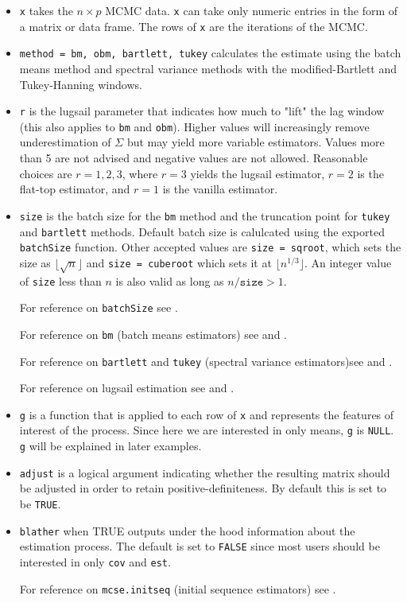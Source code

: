 \documentclass[11pt]{article}
\begin{document}
\begin{itemize}
\item \texttt{x} takes the $n \times p$ MCMC data. \texttt{x} can take only numeric entries in the form of a matrix or data frame. The rows of \texttt{x} are the iterations of the MCMC.

\item \texttt{method = bm, obm, bartlett, tukey} calculates the estimate using the batch means method and spectral variance methods with the modified-Bartlett and Tukey-Hanning windows.

\item \texttt{r} is the lugsail parameter that indicates how much to "lift" the lag window (this also  applies to \texttt{bm} and \texttt{obm}). Higher values will increasingly remove underestimation of $\Sigma$ but may yield more variable estimators. Values more than 5 are not advised and negative values are not allowed. Reasonable choices are $r = 1, 2, 3$, where $r = 3$ yields the lugsail estimator, $r = 2$ is the flat-top estimator, and $r = 1$ is the vanilla estimator. 

\item \texttt{size} is the batch size for the \texttt{bm} method and the truncation point for \texttt{tukey} and \texttt{bartlett} methods. Default batch size is calulcated using the exported \texttt{batchSize} function. Other accepted values are \texttt{size = sqroot}, which sets the size as $\lfloor \sqrt{n} \rfloor$ and \texttt{size = cuberoot} which sets it at $\lfloor n^{1/3} \rfloor$. An integer value of \texttt{size} less than $n$ is also valid as long as $n/\texttt{size} > 1$.

For reference on \texttt{batchSize} see \cite{liu:vats:2021}.

For reference on \texttt{bm} (batch means estimators) see \cite{jones2006fixed} and \cite{vats:fleg:jones:2017b}.

For reference on \texttt{bartlett} and \texttt{tukey} (spectral variance estimators)see \cite{flegal2010batch} and \cite{vats2015strong}.

For reference on lugsail estimation see \cite{liu:fleg:2018} and \cite{vats:fleg:2018}.

\item \texttt{g} is a function that is applied to each row of \texttt{x} and represents the features of interest of the process. Since here we are interested in only means, \texttt{g} is \texttt{NULL}. \texttt{g} will be explained in later examples.

\item \texttt{adjust} is a logical argument indicating whether the resulting matrix should be adjusted in order to retain positive-definiteness. By default this is set to be \texttt{TRUE}.

\item \texttt{blather} when TRUE outputs under the hood information about the estimation process. The default is set to \texttt{FALSE} since most users should be interested in only \texttt{cov} and \texttt{est}.

For reference on \texttt{mcse.initseq} (initial sequence estimators) see \cite{dai2017multivariate}.
\end{itemize}
\end{document}

